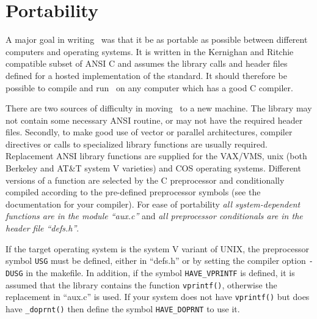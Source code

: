 \section{Portability}
A major goal in writing \moldy\ was that it be as portable as possible
between different computers  and operating systems.  It is  written in
the Kernighan and Ritchie\cite{kernighan:78} compatible subset of ANSI
C and assumes the library calls and header files  defined for a hosted
implementation of the  standard.  It  should therefore be possible  to
compile and run \moldy\ on any computer which has a good C compiler.

There are two sources of difficulty in moving \moldy\  to a new machine.
The library may not contain some necessary ANSI routine, or
may not have the required header files.  Secondly, to make good use of
vector or parallel architectures, compiler directives or calls to
specialized library functions are usually required.
Replacement ANSI library functions are supplied for the VAX/VMS,
unix (both Berkeley and AT\&T system V varieties) and COS operating
systems.  Different versions of a function are selected by the C
preprocessor and conditionally compiled according to the pre-defined
preprocessor symbols (see the documentation for your compiler).  For
ease of portability {\em all system-dependent functions are in the
module ``aux.c''} and {\em all preprocessor conditionals are in the
header file ``defs.h''}.

If the target operating system is the system V variant of UNIX, the
preprocessor symbol \verb'USG' must be defined, either in ``defs.h'' or by
setting the compiler option \verb'-DUSG' in the makefile. In addition, if
the symbol \verb'HAVE_VPRINTF' is defined, it is assumed that the library
contains the function  \verb'vprintf()', otherwise the replacement in
``aux.c'' is used. If your system does not have \verb'vprintf()' but
does have \verb'_doprnt()' then define the symbol \verb'HAVE_DOPRNT' to
use it.


